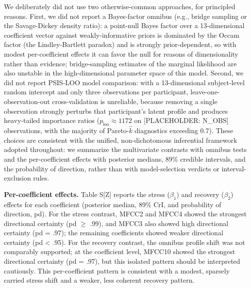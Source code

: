 \documentclass[
  english,
  man,floatsintext]{apa6}
\begin{document}
We deliberately did not use two otherwise-common approaches, for principled reasons. First, we did not report a Bayes-factor omnibus (e.g., bridge sampling or the Savage-Dickey density ratio): a point-null Bayes factor over a 13-dimensional coefficient vector against weakly-informative priors is dominated by the Occam factor (the Lindley-Bartlett paradox) and is strongly prior-dependent, so with modest per-coefficient effects it can favor the null for reasons of dimensionality rather than evidence; bridge-sampling estimates of the marginal likelihood are also unstable in the high-dimensional parameter space of this model. Second, we did not report PSIS-LOO model comparison: with a 13-dimensional subject-level random intercept and only three observations per participant, leave-one-observation-out cross-validation is unreliable, because removing a single observation strongly perturbs that participant's latent profile and produces heavy-tailed importance ratios (\(p_{\text{loo}} \approx 1172\) on {[}PLACEHOLDER: N\_OBS{]} observations, with the majority of Pareto-\(\hat{k}\) diagnostics exceeding 0.7). These choices are consistent with the unified, non-dichotomous inferential framework adopted throughout: we summarize the multivariate contrasts with omnibus tests and the per-coefficient effects with posterior medians, 89\% credible intervals, and the probability of direction, rather than with model-selection verdicts or interval-exclusion rules.

\textbf{Per-coefficient effects.} Table S{[}Z{]} reports the stress (\(\beta_1\)) and recovery (\(\beta_2\)) effects for each coefficient (posterior median, 89\% CrI, and probability of direction, pd). For the stress contrast, MFCC2 and MFCC4 showed the strongest directional certainty (pd \(\geq\) .99), and MFCC3 also showed high directional certainty (pd = .97); the remaining coefficients showed weaker directional certainty (pd \textless{} .95). For the recovery contrast, the omnibus profile shift was not comparably supported; at the coefficient level, MFCC10 showed the strongest directional certainty (pd = .97), but this isolated pattern should be interpreted cautiously. This per-coefficient pattern is consistent with a modest, sparsely carried stress shift and a weaker, less coherent recovery pattern.
\end{document}

